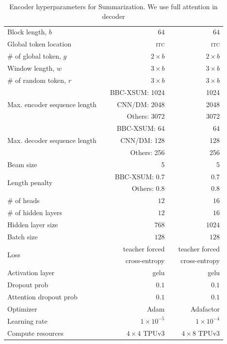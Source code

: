\begin{table}[bht]
\begin{tabular}{@{}l r r c r @{}}
 Block length, $b$ & & $64$ & & $64$\\
 Global token location & & \textsc{itc} & & \textsc{itc} \\
 $\#$ of global token, $g$ & & $2\times b$ & & $2\times b$ \\
 Window length, $w$  & & $3\times b$ & & $3\times b$ \\
 $\#$ of random token, $r$ & & $3\times b$ & & $3\times b$ \\
 \multirow{3}{*}{Max. encoder sequence length} & & BBC-XSUM: \qquad \phantom{.}1024 & & 1024 \\
 & & CNN/DM: \qquad \phantom{.}2048  & & 2048 \\
 & & Others: \qquad \phantom{.}3072 & & 3072 \\
 \multirow{3}{*}{Max. decoder sequence length} & & BBC-XSUM: \qquad \phantom{10.}64 & & 64 \\
 & & CNN/DM: \qquad \phantom{1.}128  & & 128 \\
 & & Others: \qquad \phantom{1.}256  & & 256 \\
 Beam size & & 5 & & 5 \\
 \multirow{2}{*}{Length penalty} & & BBC-XSUM: \qquad \phantom{10}0.7 & & 0.7 \\
 & & Others: \qquad \phantom{10}0.8  & & 0.8 \\
 $\#$ of heads & & $12$ & & $16$\\
 $\#$ of hidden layers & & $12$ & & $16$ \\
 Hidden layer size & & $768$ & & $1024$ \\
 Batch size & & $128$ & & $128$ \\
 \multirow{2}{*}{Loss} & & teacher forced & & teacher forced \\
 & & cross-entropy & & cross-entropy \\
 Activation layer & & gelu & & gelu \\ 
 Dropout prob & & $0.1$ & & $0.1$ \\
 Attention dropout prob & & $0.1$ & & $0.1$ \\
 Optimizer & & Adam & & Adafactor\\
 Learning rate & & $1\times10^{-5}$  & & $1\times10^{-4}$\\
  Compute resources & & $4 \times 4$ TPUv3 & & $4 \times 8$ TPUv3\\
\bottomrule
\end{tabular}
\vspace{2mm}
\caption{Encoder hyperparameters for Summarization. We use full attention in decoder}
\label{tab:app_sum}
\end{table}

